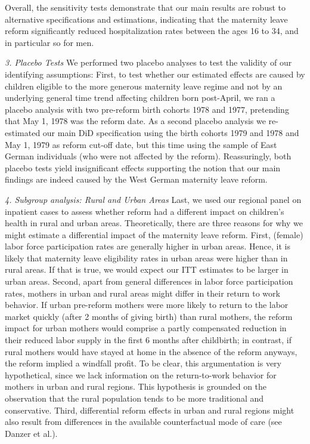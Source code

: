 \documentclass[11pt, a4paper]{article} %
\begin{document}
Overall, the sensitivity tests demonstrate that our main results are robust to alternative specifications and estimations, indicating that the maternity leave reform significantly reduced hospitalization rates between the ages 16 to 34, and in particular so for men.\newline

\textit{3. Placebo Tests}\newline
We performed two placebo analyses to test the validity of our identifying assumptions: First, to test whether our estimated effects are caused by children eligible to the more generous maternity leave regime and not by an underlying general time trend affecting children born post-April, we ran a placebo analysis with two pre-reform birth cohorts 1978 and 1977, pretending that May 1, 1978 was the reform date. As a second placebo analysis we re-estimated our main DiD specification using the birth cohorts 1979 and 1978 and May 1, 1979 as reform cut-off date, but this time using the sample of East German individuals (who were not affected by the reform).  
Reassuringly, both placebo tests yield insignificant effects supporting the notion that our main findings are indeed caused by the West German maternity leave reform.\newline

\textit{4. Subgroup analysis: Rural and Urban Areas}\newline
Last, we used our regional panel on inpatient cases to assess whether reform had a different impact on children's health in rural and urban areas. Theoretically, there are three reasons for why we might estimate a differential impact of the maternity leave reform. First, (female) labor force participation rates are generally higher in urban areas. Hence, it is likely that maternity leave eligibility rates in urban areas were higher than in rural areas. If that is true, we would expect our ITT estimates to be larger in urban areas. Second, apart from general differences in labor force participation rates, mothers in urban and rural areas might differ in their return to work behavior. If urban pre-reform mothers were more likely to return to the labor market quickly (after 2 months of giving birth) than rural mothers, the reform impact for urban mothers would comprise a partly compensated reduction in their reduced labor supply in the first 6 months after childbirth; in contrast, if rural mothers would have stayed at home in the absence of the reform anyways, the reform implied a windfall profit. To be clear, this argumentation is very hypothetical, since we lack information on the return-to-work behavior for mothers in urban and rural regions. This hypothesis is grounded on the observation that the rural population tends to be more traditional and conservative. Third, differential reform effects in urban and rural regions might also result from differences in the available counterfactual mode of care (see Danzer et al.). 
\end{document}
